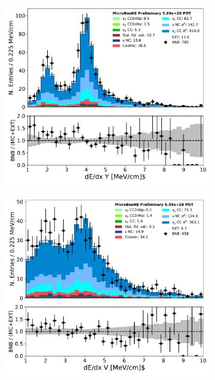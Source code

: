 \begin{figure}[H] 
\begin{center}
    \begin{subfigure}[b]{0.3\textwidth}
    \centering
    \includegraphics[width=1.00\textwidth]{pi0/calorimetry/shr_tkfit_dedx_Y_03112020_ALL_scaled_pz075.pdf}
    \caption{}
    \end{subfigure}
    \begin{subfigure}[b]{0.3\textwidth}
    \centering
    \includegraphics[width=1.00\textwidth]{pi0/calorimetry/shr_tkfit_dedx_V_03112020_ALL_scaled_pz075.pdf}

\end{subfigure}
\end{center}
\end{figure}
